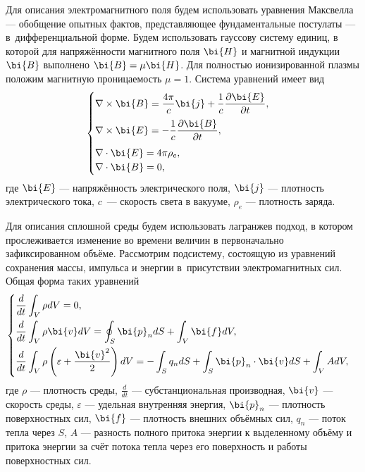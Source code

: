 \documentclass[12pt, a4paper]{article}
\begin{document}
	Для описания электромагнитного поля будем использовать уравнения Максвелла --- обобщение опытных фактов, представляющее фундаментальные постулаты --- в~дифференциальной форме. Будем использовать гауссову систему единиц, в которой для напряжённости магнитного поля $\bi{H}$ и магнитной индукции $\bi{B}$ выполнено $\bi{B} = \mu \bi{H}$. Для полностью ионизированной плазмы положим магнитную проницаемость $\mu = 1$. Система уравнений имеет вид \cite{Kulikovskiy}
	\begin{equation}
	\label{Maxwell}
	\begin{cases}
		\nabla \times \bi{B} = \dfrac{4\pi}{c}\bi{j} + \dfrac1c \dfrac{\partial \bi{E}}{\partial t}, \\[3mm]
		\nabla \times \bi{E} =  -\dfrac1c \dfrac{\partial \bi{B}}{\partial t}, \\[3mm]
		\nabla \cdot \bi{E} = 4\pi\rho_{e}, \\
		\nabla \cdot \bi{B} = 0,
	\end{cases}
	\end{equation}
	где $\bi{E}$ --- напряжённость электрического поля, $\bi{j}$ --- плотность электрического тока, $c$~--- скорость света в вакууме, $\rho_e$ --- плотность заряда.
	
	Для описания сплошной среды будем использовать лагранжев подход, в котором прослеживается изменение во времени величин в первоначально зафиксированном объёме. Рассмотрим подсистему, состоящую из уравнений сохранения массы, импульса и энергии в~присутствии электромагнитных сил. Общая форма таких уравнений 
	\begin{equation}
	\label{Movement}
	\begin{cases}
	\displaystyle	\dfrac{d}{dt} \int_V \rho dV = 0, \\[3mm]
	\displaystyle	\dfrac{d}{dt} \int_V \rho\bi{v} dV = \oint_S \bi{p}_n dS + \int_V \bi{f} dV, \\[3mm]
	\displaystyle \dfrac{d}{dt} \int_V \rho \left(\varepsilon + \frac{\bi{v}^2}{2}\right) dV = -\int_S q_n dS + \int_S \bi{p}_n \cdot \bi{v} dS + \int_V A dV,
	\end{cases}
	\end{equation}
	где $\rho$ --- плотность среды, $\frac{d}{dt}$ --- субстанциональная производная, $\bi{v}$ --- скорость среды, $\varepsilon$ --- удельная внутренняя энергия, $\bi{p}_n$ --- плотность поверхностных сил, $\bi{f}$ --- плотность внешних объёмных сил, $q_n$ --- поток тепла через $S$, $A$ --- разность полного притока энергии к выделенному объёму и притока энергии за счёт потока тепла через его поверхность и работы поверхностных сил.
	
\end{document}

